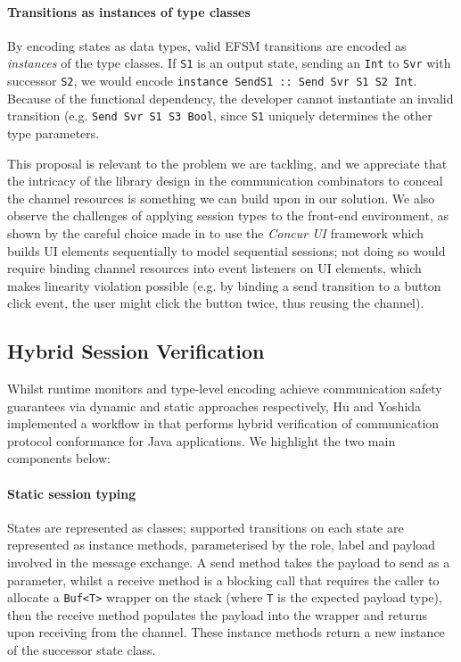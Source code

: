 \paragraph{Transitions as instances of type classes} By encoding states as data types, valid EFSM transitions are encoded as \textit{instances} of the type classes. If \texttt{S1} is an output state, sending an \texttt{Int} to \texttt{Svr} with successor \texttt{S2}, we would encode \texttt{instance SendS1 :: Send Svr S1 S2 Int}. Because of the functional dependency, the developer cannot instantiate an invalid transition (e.g. \texttt{Send Svr S1 S3 Bool}, since \texttt{S1} uniquely determines the other type parameters. 

This proposal is relevant to the problem we are tackling, and we appreciate that the intricacy of the library design in the communication combinators to conceal the channel resources is something we can build upon in our solution. We also observe the challenges of applying session types to the front-end environment, as shown by the careful choice made in \cite{PureScript2019} to use the \textit{Concur UI} framework which builds UI elements sequentially to model sequential sessions; not doing so would require binding channel resources into event listeners on UI elements, which makes linearity violation possible (e.g. by binding a send transition to a button click event, the user might click the button twice, thus reusing the channel).

\subsection{Hybrid Session Verification}
Whilst runtime monitors and type-level encoding achieve communication safety guarantees via dynamic and static approaches respectively, Hu and Yoshida implemented a workflow in \cite{Hybrid2016} that performs hybrid verification of communication protocol conformance for Java applications. We highlight the two main components below:

\paragraph{Static session typing} States are represented as classes; supported transitions on each state are represented as instance methods, parameterised by the role, label and payload involved in the message exchange. A send method takes the payload to send as a parameter, whilst a receive method is a blocking call that requires the caller to allocate a \texttt{Buf<T>} wrapper on the stack (where \texttt{T} is the expected payload type), then the receive method populates the payload into the wrapper and returns upon receiving from the channel. These instance methods return a new instance of the successor state class.

